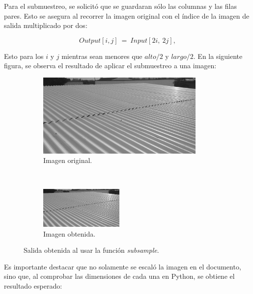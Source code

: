 \documentclass[12pt, letterpaper]{article}
\begin{document}
\par Para el submuestreo, se solicitó que se guardaran sólo las columnas y las filas pares. Esto se asegura al recorrer la imagen original con el índice de la imagen de salida multiplicado por dos:

\begin{equation*}
  Output[i, j] \: = \: Input[2i, \: 2j],
\end{equation*}

Esto para los $i$ y $j$ mientras sean menores que $alto/2$ y $largo/2$. En la siguiente figura, se observa el resultado de aplicar el submuestreo a una imagen:

\begin{figure}[H]
  \centering
  \begin{subfigure}[t]{0.45\textwidth}
    \centering
    \includegraphics[width = 0.9\textwidth]{techo.png}
    \caption{Imagen original.}
  \end{subfigure}
  ~ 
  \begin{subfigure}[t]{0.45\textwidth}
      \centering
      \includegraphics[width = 0.45\textwidth]{conv/techosub.png}
      \caption{Imagen obtenida.}
  \end{subfigure}
  \caption{Salida obtenida al usar la función \textit{subsample}.}
  \label{substecho}
\end{figure}

\par Es importante destacar que no solamente se escaló la imagen en el documento, sino que, al comprobar las dimensiones de cada una en Python, se obtiene el resultado esperado:
\end{document}
